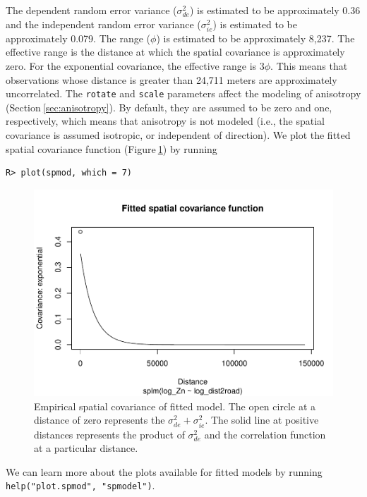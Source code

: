 \documentclass[10pt,letterpaper]{article}
\begin{document}
The dependent random error variance (\(\sigma^2_{de}\)) is estimated to
be approximately 0.36 and the independent random error variance
(\(\sigma^2_{ie}\)) is estimated to be approximately 0.079. The range
(\(\phi\)) is estimated to be approximately 8,237. The effective range
is the distance at which the spatial covariance is approximately zero.
For the exponential covariance, the effective range is \(3\phi\). This
means that observations whose distance is greater than 24,711 meters are
approximately uncorrelated. The \texttt{rotate} and \texttt{scale}
parameters affect the modeling of anisotropy
(Section\(~\)\ref{sec:anisotropy}). By default, they are assumed to be
zero and one, respectively, which means that anisotropy is not modeled
(i.e., the spatial covariance is assumed isotropic, or independent of
direction). We plot the fitted spatial covariance function
(Figure\(~\)\ref{fig:emp_spcov}) by running

\begin{verbatim}
R> plot(spmod, which = 7)
\end{verbatim}

\begin{figure}

{\centering \includegraphics[width=0.75\linewidth]{preprint_files/figure-latex/emp_spcov-1} 

}

\caption{Empirical spatial covariance of fitted model. The open circle at a distance of zero represents the $\sigma^2_{de} + \sigma^2_{ie}$. The solid line at positive distances represents the product of $\sigma^2_{de}$ and the correlation function at a particular distance.}\label{fig:emp_spcov}
\end{figure}

We can learn more about the plots available for fitted models by running
\texttt{help("plot.spmod",\ "spmodel")}.
\end{document}
